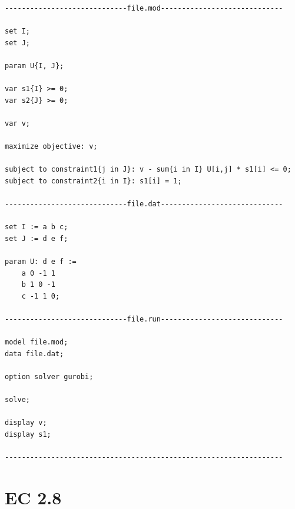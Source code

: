 \begin{verbatim}
-----------------------------file.mod-----------------------------

set I;
set J;

param U{I, J};

var s1{I} >= 0;
var s2{J} >= 0;

var v;

maximize objective: v;

subject to constraint1{j in J}: v - sum{i in I} U[i,j] * s1[i] <= 0;
subject to constraint2{i in I}: s1[i] = 1;

-----------------------------file.dat-----------------------------

set I := a b c;
set J := d e f;

param U: d e f :=
	a 0 -1 1
	b 1 0 -1
	c -1 1 0;
	
-----------------------------file.run-----------------------------

model file.mod;
data file.dat;

option solver gurobi;

solve;

display v;
display s1;

------------------------------------------------------------------
\end{verbatim}

\section{EC 2.8}


